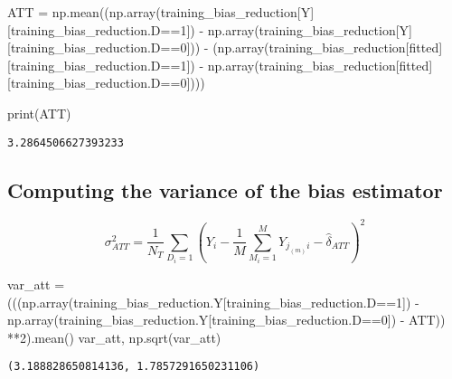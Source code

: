 \documentclass[
  letterpaper,
  DIV=11,
  numbers=noendperiod]{scrartcl}
\newenvironment{Shaded}{\begin{snugshade}}{\end{snugshade}}
\newcommand{\BuiltInTok}[1]{\textcolor[rgb]{0.00,0.23,0.31}{#1}}
\newcommand{\DecValTok}[1]{\textcolor[rgb]{0.68,0.00,0.00}{#1}}
\newcommand{\NormalTok}[1]{\textcolor[rgb]{0.00,0.23,0.31}{#1}}
\newcommand{\OperatorTok}[1]{\textcolor[rgb]{0.37,0.37,0.37}{#1}}
\newcommand{\StringTok}[1]{\textcolor[rgb]{0.13,0.47,0.30}{#1}}
\begin{document}
\begin{Shaded}
\begin{Highlighting}[]
\NormalTok{ATT }\OperatorTok{=}\NormalTok{ np.mean((np.array(training\_bias\_reduction[}\StringTok{\textquotesingle{}Y\textquotesingle{}}\NormalTok{][training\_bias\_reduction.D}\OperatorTok{==}\DecValTok{1}\NormalTok{]) }\OperatorTok{{-}}\NormalTok{ np.array(training\_bias\_reduction[}\StringTok{\textquotesingle{}Y\textquotesingle{}}\NormalTok{][training\_bias\_reduction.D}\OperatorTok{==}\DecValTok{0}\NormalTok{])) }\OperatorTok{{-}}
\NormalTok{ (np.array(training\_bias\_reduction[}\StringTok{\textquotesingle{}fitted\textquotesingle{}}\NormalTok{][training\_bias\_reduction.D}\OperatorTok{==}\DecValTok{1}\NormalTok{]) }\OperatorTok{{-}}\NormalTok{ np.array(training\_bias\_reduction[}\StringTok{\textquotesingle{}fitted\textquotesingle{}}\NormalTok{][training\_bias\_reduction.D}\OperatorTok{==}\DecValTok{0}\NormalTok{])))}

\BuiltInTok{print}\NormalTok{(ATT)}
\end{Highlighting}
\end{Shaded}

\begin{verbatim}
3.2864506627393233
\end{verbatim}

\hypertarget{computing-the-variance-of-the-bias-estimator}{%
\subsection{Computing the variance of the bias
estimator}\label{computing-the-variance-of-the-bias-estimator}}

\[
\sigma^2_{ATT} = \frac{1}{N_T} \sum_{D_i=1}(Y_i - \frac{1}{M} \sum_{M_i=1}^{M} {Y_{j_{(m)}i} - \hat{\delta}_{ATT}})^2
\]

\begin{Shaded}
\begin{Highlighting}[]
\NormalTok{var\_att }\OperatorTok{=}\NormalTok{ (((np.array(training\_bias\_reduction.Y[training\_bias\_reduction.D}\OperatorTok{==}\DecValTok{1}\NormalTok{]) }\OperatorTok{{-}}\NormalTok{ np.array(training\_bias\_reduction.Y[training\_bias\_reduction.D}\OperatorTok{==}\DecValTok{0}\NormalTok{]) }\OperatorTok{{-}}\NormalTok{ ATT)) }\OperatorTok{**}\DecValTok{2}\NormalTok{).mean()}
\NormalTok{var\_att, np.sqrt(var\_att)}
\end{Highlighting}
\end{Shaded}

\begin{verbatim}
(3.188828650814136, 1.7857291650231106)
\end{verbatim}
\end{document}
